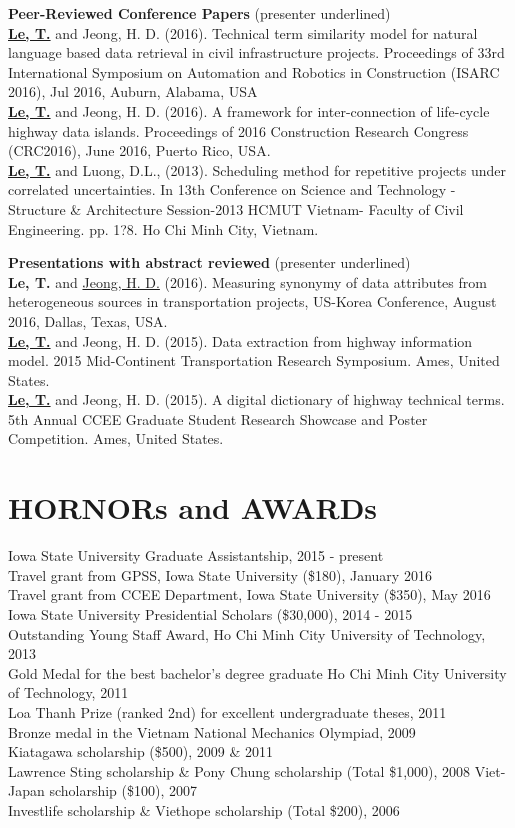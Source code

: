 \documentclass[11pt]{res}
\begin{document}
\begin{resume}
{\bf Peer-Reviewed Conference Papers} (presenter underlined)\\
{\bf \underline{Le, T.}} and Jeong, H. D. (2016). Technical term similarity model for natural language based data retrieval in civil infrastructure projects. Proceedings of 33rd International Symposium on Automation and Robotics in Construction (ISARC 2016), Jul 2016, Auburn, Alabama, USA\\
{\bf \underline{Le, T.}} and Jeong, H. D. (2016). A framework for inter-connection of life-cycle highway data islands. Proceedings of 2016 Construction Research Congress (CRC2016), June 2016, Puerto Rico, USA.\\
{\bf \underline{Le, T.}} and Luong, D.L., (2013). Scheduling method for repetitive projects under correlated uncertainties. In 13th Conference on Science and Technology - Structure \& Architecture Session-2013 HCMUT Vietnam- Faculty of Civil Engineering. pp. 1?8. Ho Chi Minh City, Vietnam.

{\bf Presentations with abstract reviewed} (presenter underlined) \\
{\bf Le, T.} and  \underline{Jeong, H. D.}  (2016). Measuring synonymy of data attributes from heterogeneous sources in transportation projects, US-Korea Conference, August 2016, Dallas, Texas, USA.\\
{\bf \underline{Le, T.}}  and Jeong, H. D. (2015). Data extraction from highway information model. 2015 Mid-Continent Transportation Research Symposium. Ames, United States. \\
{\bf \underline{Le, T.}}  and Jeong, H. D. (2015). A digital dictionary of highway technical terms. 5th Annual CCEE Graduate Student Research Showcase and Poster Competition. Ames, United States.

\section{HORNORs and AWARDs}
Iowa State University Graduate Assistantship, \hfill 2015 - present\\
Travel grant from GPSS, Iowa State University (\$180), \hfill January 2016\\
Travel grant from CCEE Department, Iowa State University (\$350), \hfill May 2016\\
Iowa State University Presidential Scholars (\$30,000), \hfill 2014 - 2015\\
Outstanding Young Staff Award, Ho Chi Minh City University of Technology, \hfill 2013\\
Gold Medal for the best bachelor's degree graduate Ho Chi Minh City University of Technology, \hfill 2011\\
Loa Thanh Prize (ranked 2nd) for excellent undergraduate theses, \hfill 2011\\
Bronze medal in the Vietnam National Mechanics Olympiad, \hfill 2009\\
Kiatagawa scholarship (\$500), \hfill 2009 \& 2011\\
Lawrence Sting scholarship \& Pony Chung scholarship (Total \$1,000),  \hfill 2008
Viet-Japan scholarship (\$100), \hfill 2007\\
Investlife scholarship \& Viethope scholarship (Total \$200), \hfill 2006


\end{resume}
\end{document}
